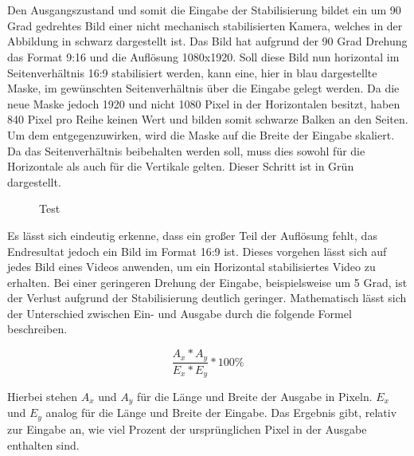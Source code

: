     \\ \\
    Den Ausgangszustand und somit die Eingabe der Stabilisierung bildet ein um 90 Grad gedrehtes Bild einer nicht mechanisch stabilisierten Kamera, welches in der Abbildung in schwarz dargestellt ist. Das Bild hat aufgrund der 90 Grad Drehung das Format 9:16 und die Auflösung 1080x1920. Soll diese Bild nun horizontal im Seitenverhältnis 16:9 stabilisiert werden, kann eine, hier in blau dargestellte Maske, im gewünschten Seitenverhältnis über die Eingabe gelegt werden. Da die neue Maske jedoch 1920 und nicht 1080 Pixel in der Horizontalen besitzt, haben 840 Pixel pro Reihe keinen Wert und bilden somit schwarze Balken an den Seiten. Um dem entgegenzuwirken, wird die Maske auf die Breite der Eingabe skaliert. Da das Seitenverhältnis beibehalten werden soll, muss dies sowohl für die Horizontale als auch für die Vertikale gelten. Dieser Schritt ist in Grün dargestellt.



\newpage

\begin{figure}[h]
    \centering
    \def\svgwidth{\linewidth}
    
    \vspace{0.5cm}
    \caption{Test}
    \label{vektorgrafik}
\end{figure}

    Es lässt sich eindeutig erkenne, dass ein großer Teil der Auflösung fehlt, das Endresultat jedoch ein Bild im Format 16:9 ist. Dieses vorgehen lässt sich auf jedes Bild eines Videos anwenden, um ein Horizontal stabilisiertes Video zu erhalten. Bei einer geringeren Drehung der Eingabe, beispielsweise um 5 Grad, ist der Verlust aufgrund der Stabilisierung deutlich geringer. Mathematisch lässt sich der Unterschied zwischen Ein- und Ausgabe durch die folgende Formel beschreiben.

\begin{equation}
    \frac{A_x*A_y}{E_x*E_y}*100\%
\end{equation}


    Hierbei stehen $A_x$ und $A_y$ für die Länge und Breite der Ausgabe in Pixeln. $E_x$ und $E_y$ analog für die Länge und Breite der Eingabe. Das Ergebnis gibt, relativ zur Eingabe an, wie viel Prozent der ursprünglichen Pixel in der Ausgabe enthalten sind.